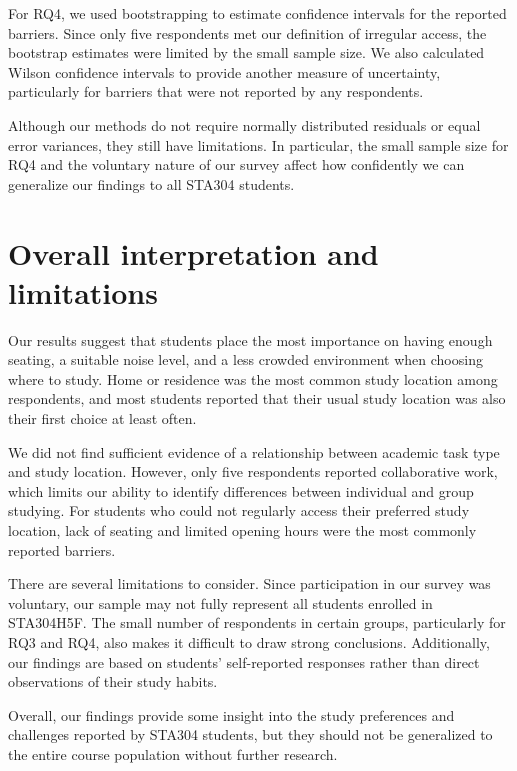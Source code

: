 \documentclass[11pt,letterpaper]{article}
\begin{document}
For RQ4, we used bootstrapping to estimate confidence intervals for the reported barriers. Since only five respondents met our definition of irregular access, the bootstrap estimates were limited by the small sample size. We also calculated Wilson confidence intervals to provide another measure of uncertainty, particularly for barriers that were not reported by any respondents.

Although our methods do not require normally distributed residuals or equal error variances, they still have limitations. In particular, the small sample size for RQ4 and the voluntary nature of our survey affect how confidently we can generalize our findings to all STA304 students.


\section{Overall interpretation and limitations}
Our results suggest that students place the most importance on having enough seating, a suitable noise level, and a less crowded environment when choosing where to study. Home or residence was the most common study location among respondents, and most students reported that their usual study location was also their first choice at least often.

We did not find sufficient evidence of a relationship between academic task type and study location. However, only five respondents reported collaborative work, which limits our ability to identify differences between individual and group studying. For students who could not regularly access their preferred study location, lack of seating and limited opening hours were the most commonly reported barriers.

There are several limitations to consider. Since participation in our survey was voluntary, our sample may not fully represent all students enrolled in STA304H5F. The small number of respondents in certain groups, particularly for RQ3 and RQ4, also makes it difficult to draw strong conclusions. Additionally, our findings are based on students' self-reported responses rather than direct observations of their study habits.

Overall, our findings provide some insight into the study preferences and challenges reported by STA304 students, but they should not be generalized to the entire course population without further research.

\appendix
\end{document}
